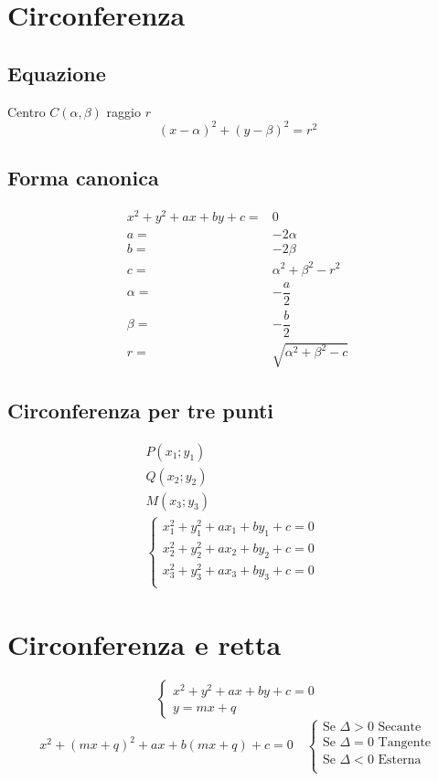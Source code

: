 \chapter{Circonferenza}
\section{Equazione}
Centro $C(\alpha,\beta)$ raggio $r$
\begin{equation*}
(x-\alpha)^2+(y-\beta)^2=r^2
\end{equation*}
\section{Forma canonica}
\begin{align*}
x^2+y^2+ax+by+c=&0\\
a=&-2\alpha\\
b=&-2\beta\\
c=&\alpha^2+\beta^2-r^2\\
\alpha=&-\dfrac{a}{2}\\
\beta=&-\dfrac{b}{2}\\
r=&\sqrt{\alpha^2+\beta^2-c}
\end{align*}

\section{Circonferenza per tre punti}
\begin{align*}
P(x_1;y_1)&\\
Q(x_2;y_2)&\\
M(x_3;y_3)&\\
\begin{cases}
x_1^2+y_1^2+ax_1+by_1+c=0\\
x_2^2+y_2^2+ax_2+by_2+c=0\\
x_3^2+y_3^2+ax_3+by_3+c=0\\
\end{cases}&
\end{align*}
\chapter{Circonferenza e retta}
\begin{equation*}
\begin{cases}
x^2+y^2+ax+by+c=0\\
y=mx+q
\end{cases}
\end{equation*}
\begin{equation*}
x^2+(mx+q)^2+ax+b(mx+q)+c=0\quad\begin{cases}
\text{Se $\Delta >0$ Secante}\\
\text{Se $\Delta =0$ Tangente}\\
\text{Se $\Delta <0$ Esterna}\\
\end{cases}
\end{equation*}
